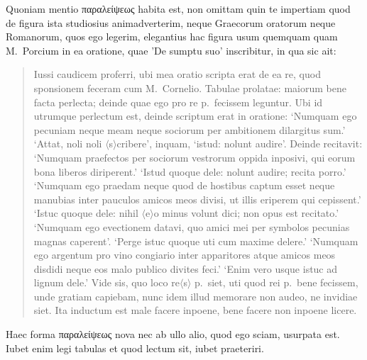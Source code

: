 Quoniam mentio παραλείψεως habita est, non omittam quin te impertiam quod de figura ista studiosius animadverterim, neque Graecorum oratorum neque Romanorum, quos ego legerim, elegantius hac figura usum quemquam quam M.\ Porcium in ea oratione, quae 'De sumptu suo' inscribitur, in qua sic ait: 
\begin{quotation}
\noindent Iussi caudicem proferri, ubi mea oratio scripta erat de ea re, quod sponsionem feceram cum M.\ Cornelio. Tabulae prolatae: maiorum bene facta perlecta; deinde quae ego pro re p.\ fecissem leguntur. Ubi id utrumque perlectum est, deinde scriptum erat in oratione: `Numquam ego pecuniam neque meam neque sociorum per ambitionem dilargitus sum.' `Attat, noli noli $\langle$s$\rangle$cribere', inquam, `istud: nolunt audire'. Deinde recitavit: `Numquam praefectos per sociorum vestrorum oppida inposivi, qui eorum bona liberos diriperent.' `Istud quoque dele: nolunt audire; recita porro.' `Numquam ego praedam neque quod de hostibus captum esset neque manubias inter pauculos amicos meos divisi, ut illis eriperem qui cepissent.' `Istuc quoque dele: nihil $\langle$e$\rangle$o minus volunt dici; non opus est recitato.' `Numquam ego evectionem datavi, quo amici mei per symbolos pecunias magnas caperent'. `Perge istuc quoque uti cum maxime delere.' `Numquam ego argentum pro vino congiario inter apparitores atque amicos meos disdidi neque eos malo publico divites feci.' `Enim vero usque istuc ad lignum dele.' Vide sis, quo loco re$\langle$s$\rangle$ p.\ siet, uti quod rei p.\ bene fecissem, unde gratiam capiebam, nunc idem illud memorare non audeo, ne invidiae siet. Ita inductum est male facere inpoene, bene facere non inpoene licere.
\end{quotation}

\noindent Haec forma παραλείψεως nova nec ab ullo alio, quod ego sciam, usurpata est. Iubet enim legi tabulas et quod lectum sit, iubet praeteriri.
